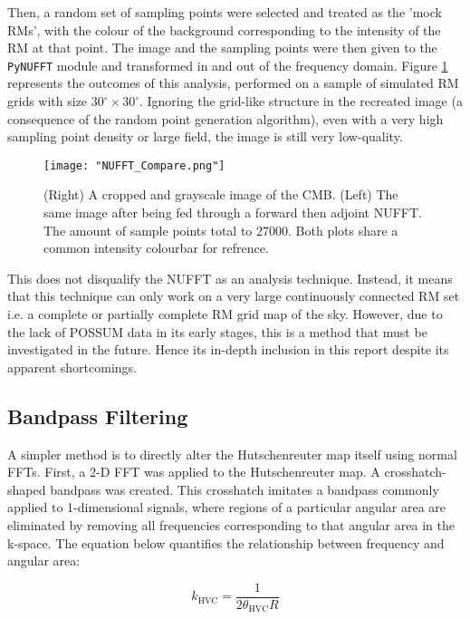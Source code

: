 Then, a random set of sampling points were selected and treated as the 'mock RMs', with the colour of the background corresponding to the intensity of the RM at that point. The image and the sampling points were then given to the \verb|PyNUFFT| module and transformed in and out of the frequency domain. Figure \ref{fig:nufft} represents the outcomes of this analysis, performed on a sample of simulated RM grids with size $30^{\circ}\times 30^{\circ}$. Ignoring the grid-like structure in the recreated image (a consequence of the random point generation algorithm), even with a very high sampling point density or large field, the image is still very low-quality.

\begin{figure}
    \texttt{[image: "NUFFT\_Compare.png"]}
    \centering
    \caption{(Right) A cropped and grayscale image of the CMB. (Left) The same image after being fed through a forward then adjoint NUFFT. The amount of sample points total to 27000. Both plots share a common intensity colourbar for refrence.}
    \label{fig:nufft}
\end{figure}


This does not disqualify the NUFFT as an analysis technique. Instead, it means that this technique can only work on a very large continuously connected RM set i.e. a complete or partially complete RM grid map of the sky. However, due to the lack of POSSUM data in its early stages, this is a method that must be investigated in the future. Hence its in-depth inclusion in this report despite its apparent shortcomings.

\subsection{Bandpass Filtering}
\label{ssec:bandpass}

A simpler method is to directly alter the Hutschenreuter map itself using normal FFTs. First, a 2-D FFT was applied to the Hutschenreuter map. A crosshatch-shaped bandpass was created. This crosshatch imitates a bandpass commonly applied to 1-dimensional signals, where regions of a particular angular area are eliminated by removing all frequencies corresponding to that angular area in the k-space. The equation below quantifies the relationship between frequency and angular area:


\begin{equation}
        k_{\mathrm{HVC}} = \frac{1}{2 \theta_{\mathrm{HVC}} R}
    \label{eq:freq_to_angle}
\end{equation}


